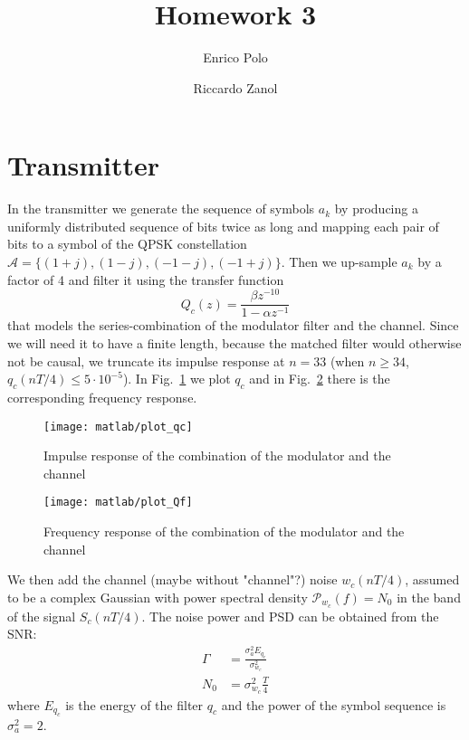 \documentclass[a4paper,oneside]{article}
\author{Enrico Polo \and Riccardo Zanol}
\title{Homework 3}
\begin{document}
\maketitle
\section{Transmitter}
In the transmitter we generate the sequence of symbols $a_k$ by
producing a uniformly distributed sequence of bits twice as long and
mapping each pair of bits to a symbol of the QPSK constellation $
\mathcal{A} = \{(1+j),(1-j),(-1-j),(-1+j)\}$. Then we up-sample $a_k$
by a factor of 4 and filter it using the transfer function
\begin{equation}
  Q_c(z) = \frac{\beta z^{-10}}{1 - \alpha z^{-1}}
\end{equation}
that models the {\color{red} series-combination of the modulator filter and
  the channel}.  Since we will need it to have a finite length,
because the matched filter would otherwise not be causal, we truncate
its impulse response at $n=33$ (when $n \geq 34$, $q_c(nT/4) \leq
5\cdot10^{-5}$). In Fig.~\ref{plot:qc} we plot $q_c$ and in
Fig.~\ref{plot:Qf} there is the corresponding frequency response.
\begin{figure}[htbp]
  \centering
  \texttt{[image: matlab/plot\_qc]}
  \caption{Impulse response of the combination of the modulator and
    the channel}
  \label{plot:qc}
\end{figure}
\begin{figure}[htbp]
  \centering
  \texttt{[image: matlab/plot\_Qf]}
  \caption{Frequency response of the combination of the modulator and
    the channel}
  \label{plot:Qf}
\end{figure}

We then add {\color{red} the channel (maybe without "channel"?) noise} $w_c(nT/4)$, assumed to be
a complex Gaussian with power spectral density $\mathcal{P}_{w_c}(f) =
N_0$ in the band of the signal $S_c(nT/4)$. The noise power and PSD
can be obtained from the SNR:
\begin{align}
  \Gamma &= \frac{\sigma^2_a E_{q_c}}{\sigma^2_{w_c}} \\
  N_0 &= \sigma^2_{w_c}\frac{T}{4}
\end{align}
where $E_{q_c}$ is the energy of the filter $q_c$ and the power of the
symbol sequence is $\sigma^2_a = 2$.
\end{document}
